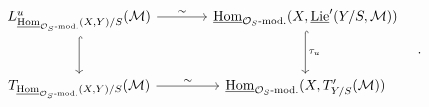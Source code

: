 \[\begin{tikzcd}[column sep=large,row sep=large]
L^u_{\underline{\operatorname{Hom}}_{\mathcal O_S\text{-mod.}}(X,Y)/S}(\mathcal M) \arrow[r,"\sim"] \arrow[d,hook] & \underline{\operatorname{Hom}}_{\mathcal O_S\text{-mod.}}(X,\underline{\operatorname{Lie}}'(Y/S,\mathcal M)) \arrow[d,hook,"\tau_u"]\\
T_{\underline{\operatorname{Hom}}_{\mathcal O_S\text{-mod.}}(X,Y)/S}(\mathcal M) \arrow[r,"\sim"] & \underline{\operatorname{Hom}}_{\mathcal O_S\text{-mod.}}(X,T'_{Y/S}(\mathcal M))
\end{tikzcd}\quad .\]
